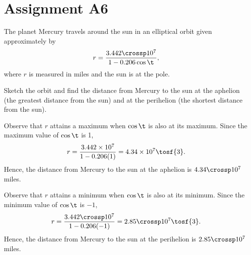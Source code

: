 \section{Assignment A6}

\begin{problem}
    The planet Mercury travels around the sun in an elliptical orbit given approximately by \[r = \dfrac{3.442 \crossp 10^7}{1 - 0.206\cos\t},\] where $r$ is measured in miles and the sun is at the pole.

    Sketch the orbit and find the distance from Mercury to the sun at the aphelion (the greatest distance from the sun) and at the perihelion (the shortest distance from the sun).
\end{problem}
\begin{solution}
    \begin{center}
    \end{center}

    Observe that $r$ attains a maximum when $\cos \t$ is also at its maximum. Since the maximum value of $\cos \t$ is 1, \[r = \dfrac{3.442 \times 10^7}{1 - 0.206(1)} = 4.34 \times 10^7 \tosf{3}.\] Hence, the distance from Mercury to the sun at the aphelion is $4.34 \crossp 10^7$ miles.

    Observe that $r$ attains a minimum when $\cos \t$ is also at its minimum. Since the minimum value of $\cos \t$ is $-1$, \[r = \dfrac{3.442 \crossp 10^7}{1 - 0.206(-1)} = 2.85 \crossp 10^7 \tosf{3}.\] Hence, the distance from Mercury to the sun at the perihelion is $2.85 \crossp 10^7$ miles.
\end{solution}

